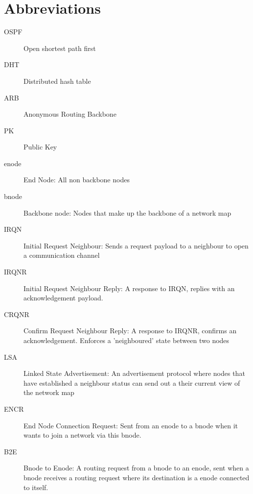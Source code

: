\chapter*{Abbreviations}\label{abbr}
\begin{description}
\item[OSPF] Open shortest path first
\item[DHT] Distributed hash table
\item[ARB] Anonymous Routing Backbone
\item[PK] Public Key
\item[enode] End Node: All non backbone nodes
\item[bnode] Backbone node: Nodes that make up the backbone of a network map
\end{description}


\begin{description}
\item[IRQN] Initial Request Neighbour: Sends a request payload to a neighbour to open a communication channel
\item[IRQNR] Initial Request Neighbour Reply: A response to IRQN, replies with an acknowledgement payload. 
\item[CRQNR] Confirm Request Neighbour Reply: A response to IRQNR, confirms an acknowledgement. Enforces a 'neighboured' state between two nodes
\item[LSA] Linked State Advertisement: An advertisement protocol where nodes that have established a neighbour status can send out a their current view of the network map
\item[ENCR] End Node Connection Request: Sent from an enode to a bnode when it wants to join a network via this bnode.
\item[B2E] Bnode to Enode: A routing request from a bnode to an enode, sent when a bnode receives a routing request where its destination is a enode connected to itself.
\end{description}